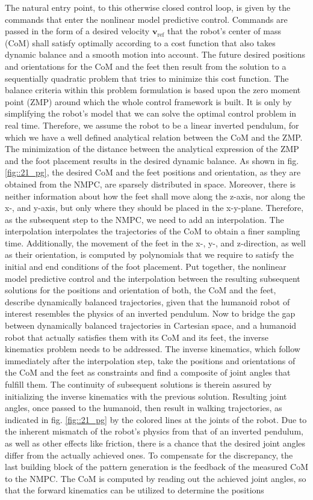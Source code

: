 The natural entry point, to this otherwise closed control loop, is given by the commands that enter the nonlinear model predictive control. Commands are passed in the form of a desired velocity $\mathbf{v}_\text{ref}$ that the robot's center of mass (CoM) shall satisfy optimally according to a cost function that also takes dynamic balance and a smooth motion into account. The future desired positions and orientations for the CoM and the feet then result from the solution to a sequentially quadratic problem that tries to minimize this cost function. The balance criteria within this problem formulation is based upon the zero moment point (ZMP) around which the whole control framework is built. It is only by simplifying the robot's model that we can solve the optimal control problem in real time. Therefore, we assume the robot to be a linear inverted pendulum, for which we have a well defined analytical relation between the CoM and the ZMP. The minimization of the distance between the analytical expression of the ZMP and the foot placement results in the desired dynamic balance. As shown in fig. \ref{fig::21_pg}, the desired CoM and the feet positions and orientation, as they are obtained from the NMPC, are sparsely distributed in space. Moreover, there is neither information about how the feet shall move along the z-axis, nor along the x-, and y-axis, but only where they should be placed in the x-y-plane. Therefore, as the subsequent step to the NMPC, we need to add an interpolation. The interpolation interpolates the trajectories of the CoM to obtain a finer sampling time. Additionally, the movement of the feet in the x-, y-, and z-direction, as well as their orientation, is computed by polynomials that we require to satisfy the initial and end conditions of the foot placement. Put together, the nonlinear model predictive control and the interpolation between the resulting subsequent solutions for the positions and orientation of both, the CoM and the feet, describe dynamically balanced trajectories, given that the humanoid robot of interest resembles the physics of an inverted pendulum. Now to bridge the gap between dynamically balanced trajectories in Cartesian space, and a humanoid robot that actually satisfies them with its CoM and its feet, the inverse kinematics problem needs to be addressed. The inverse kinematics, which follow immediately after the interpolation step, take the positions and orientations of the CoM and the feet as constraints and find a composite of joint angles that fulfill them. The continuity of subsequent solutions is therein assured by initializing the inverse kinematics with the previous solution. Resulting joint angles, once passed to the humanoid, then result in walking trajectories, as indicated in fig. \ref{fig::21_pg} by the colored lines at the joints of the robot. Due to the inherent mismatch of the robot's physics from that of an inverted pendulum, as well as other effects like friction, there is a chance that the desired joint angles differ from the actually achieved ones. To compensate for the discrepancy, the last building block of the pattern generation is the feedback of the measured CoM to the NMPC. The CoM is computed by reading out the achieved joint angles, so that the forward kinematics can be utilized to determine the positions 